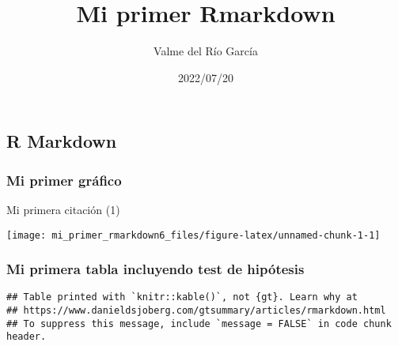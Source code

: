 \documentclass[
]{article}
\title{Mi primer Rmarkdown}
\author{Valme del Río García}
\date{2022/07/20}
\begin{document}
\maketitle

{
\setcounter{tocdepth}{3}
\tableofcontents
}
\hypertarget{r-markdown}{%
\subsection{R Markdown}\label{r-markdown}}

\hypertarget{mi-primer-gruxe1fico}{%
\subsubsection{\texorpdfstring{\textbf{Mi primer
gráfico}}{Mi primer gráfico}}\label{mi-primer-gruxe1fico}}

Mi primera citación (1)

\begin{center}\texttt{[image: mi\_primer\_rmarkdown6\_files/figure-latex/unnamed-chunk-1-1]} \end{center}

\hypertarget{mi-primera-tabla-incluyendo-test-de-hipuxf3tesis}{%
\subsubsection{\texorpdfstring{\textbf{Mi primera tabla incluyendo test
de
hipótesis}}{Mi primera tabla incluyendo test de hipótesis}}\label{mi-primera-tabla-incluyendo-test-de-hipuxf3tesis}}

\begin{verbatim}
## Table printed with `knitr::kable()`, not {gt}. Learn why at
## https://www.danieldsjoberg.com/gtsummary/articles/rmarkdown.html
## To suppress this message, include `message = FALSE` in code chunk header.
\end{verbatim}
\end{document}
